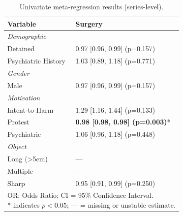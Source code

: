 \begin{table}[htbp]
\caption{Univariate meta-regression results (series-level).}
\label{tab:meta_regression_nested}
\centering

\small
\begin{tabular}{p{5cm} p{9cm}}
\toprule
\textbf{Variable} & \textbf{Surgery} \\
\midrule

\multicolumn{2}{l}{\textit{Demographic}} \\
\hspace{1em}Detained & 0.97 [0.96, 0.99] (p=0.157) \\
\hspace{1em}Psychiatric History & 1.03 [0.89, 1.18] (p=0.771) \\

\multicolumn{2}{l}{\textit{Gender}} \\
\hspace{1em}Male & 0.97 [0.96, 0.99] (p=0.157) \\

\multicolumn{2}{l}{\textit{Motivation}} \\
\hspace{1em}Intent-to-Harm & 1.29 [1.16, 1.44] (p=0.133) \\
\hspace{1em}Protest & \textbf{0.98 [0.98, 0.98] (p=0.003)}* \\
\hspace{1em}Psychiatric & 1.06 [0.96, 1.18] (p=0.448) \\

\multicolumn{2}{l}{\textit{Object}} \\
\hspace{1em}Long (>5cm) & --- \\
\hspace{1em}Multiple & --- \\
\hspace{1em}Sharp & 0.95 [0.91, 0.99] (p=0.250) \\
\multicolumn{2}{l}{\small \parbox[t]{\columnwidth}{OR: Odds Ratio; CI = 95\% Confidence Interval.\\
* indicates $p < 0.05$; --- = missing or unstable estimate.}} \\
\bottomrule
\end{tabular}
\end{table}
